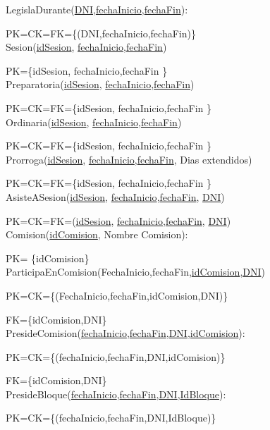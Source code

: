 LegislaDurante(\underline{DNI},\underline{fechaInicio},\underline{fechaFin}):

PK=CK=FK={\{(DNI,fechaInicio,fechaFin)}\}\\

Sesion(\underline{idSesion}, \underline{fechaInicio},\underline{fechaFin})

PK={\{idSesion, fechaInicio,fechaFin }\}\\

Preparatoria(\underline{idSesion}, \underline{fechaInicio},\underline{fechaFin})

PK=CK=FK={\{idSesion, fechaInicio,fechaFin }\}\\

Ordinaria(\underline{idSesion}, \underline{fechaInicio},\underline{fechaFin})

PK=CK=FK={\{idSesion, fechaInicio,fechaFin }\}\\

Prorroga(\underline{idSesion}, \underline{fechaInicio},\underline{fechaFin}, Dias extendidos)

PK=CK=FK={\{idSesion, fechaInicio,fechaFin }\}\\

AsisteASesion(\underline{idSesion}, \underline{fechaInicio},\underline{fechaFin}, \underline{DNI})

PK=CK=FK=(\underline{idSesion}, \underline{fechaInicio},\underline{fechaFin}, \underline{DNI})\\

Comision(\underline{idComision}, Nombre Comision):

PK= {\{idComision}\}\\

ParticipaEnComision(FechaInicio,fechaFin,\underline{idComision},\underline{DNI})

PK=CK={\{(FechaInicio,fechaFin,idComision,DNI)}\}

FK={\{idComision,DNI}\}\\

PresideComision(\underline{fechaInicio},\underline{fechaFin},\underline{DNI},\underline{idComision}):

PK=CK={\{(fechaInicio,fechaFin,DNI,idComision)}\}

FK={\{idComision,DNI}\}\\

PresideBloque(\underline{fechaInicio},\underline{fechaFin},\underline{DNI},\underline{IdBloque}):

PK=CK={\{(fechaInicio,fechaFin,DNI,IdBloque)}\}

